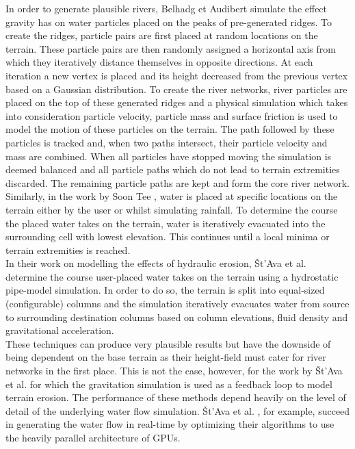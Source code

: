 In order to generate plausible rivers, Belhadg et Audibert \cite{Belhadj2005} simulate the effect gravity has on water particles placed on the peaks of pre-generated ridges. To create the ridges, particle pairs are first placed at random locations on the terrain. These particle pairs are then randomly assigned a horizontal axis from which they iteratively distance themselves in opposite directions. At each iteration a new vertex is placed and its height decreased from the previous vertex based on a Gaussian distribution. To create the river networks, river particles are placed on the top of these generated ridges and a physical simulation which takes into consideration particle velocity, particle mass and surface friction is used to model the motion of these particles on the terrain. The path followed by these particles is tracked and, when two paths intersect, their particle velocity and mass are combined. When all particles have stopped moving the simulation is deemed balanced and all particle paths which do not lead to terrain extremities discarded. The remaining particle paths are kept and form the core river network. \\

Similarly, in the work by Soon Tee \cite{Teoh2008}, water is placed at specific locations on the terrain either by the user or whilst simulating rainfall. To determine the course the placed water takes on the terrain, water is iteratively evacuated into the surrounding cell with lowest elevation. This continues until a local minima or terrain extremities is reached.\\

In their work on modelling the effects of hydraulic erosion, Št'Ava et al. \cite{StAva2008} determine the course user-placed water takes on the terrain using a hydrostatic pipe-model simulation. In order to do so, the terrain is split into equal-sized (configurable) columns and the simulation iteratively evacuates water from source to surrounding destination columns based on column elevations, fluid density and gravitational acceleration. \\

These techniques can produce very plausible results but have the downside of being dependent on the base terrain as their height-field must cater for river networks in the first place. This is not the case, however, for the work by Št'Ava et al. \cite{StAva2008} for which the gravitation simulation is used as a feedback loop to model terrain erosion. The performance of these methods depend heavily on the level of detail of the underlying water flow simulation. Št'Ava et al. \cite{StAva2008}, for example, succeed in generating the water flow in real-time by optimizing their algorithms to use the heavily parallel architecture of GPUs.

